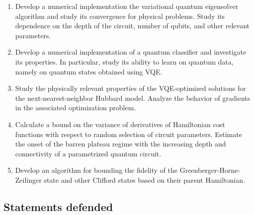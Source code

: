 \begin{enumerate}
    \item Develop a numerical implementation the variational quantum eigensolver algorithm and study its convergence for physical problems. Study its dependence on the depth of the circuit, number of qubits, and other relevant parameters.
    \item Develop a numerical implementation of a quantum classifier and investigate its properties. In particular, study its ability to learn on quantum data, namely on quantum states obtained using VQE.
    \item Study the physically relevant properties of the VQE-optimized solutions for the next-nearest-neighbor Hubbard model. Analyze the behavior of gradients in the associated optimization problem.
    \item Calculate a bound on the variance of derivatives of Hamiltonian cost functions with respect to random selection of circuit parameters. Estimate the onset of the barren plateau regime with the increasing depth and connectivity of a parametrized quantum circuit.
    \item Develop an algorithm for bounding the fidelity of the Greenberger-Horne-Zeilinger state and other Clifford states based on their parent Hamiltonian.
\end{enumerate}

\subsection*{Statements defended}

